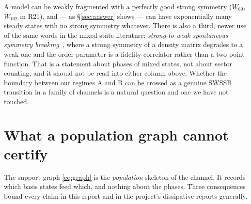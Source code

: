 \documentclass[11pt]{article}
\theoremstyle{plain}
\theoremstyle{definition}
\theoremstyle{remark}
\begin{document}
A model can be weakly fragmented with a perfectly good strong symmetry
($W_{60}$, $W_{102}$ in R21), and --- as \S\ref{sec:answer} shows --- can have
exponentially many steady states with no strong symmetry whatever. There is
also a third, newer use of the same words in the mixed-state literature:
\emph{strong-to-weak spontaneous symmetry breaking}~\cite{swssb2024}, where a
strong symmetry of a density matrix degrades to a weak one and the order
parameter is a fidelity correlator rather than a two-point function. That is a
statement about phases of mixed states, not about sector counting, and it
should not be read into either column above. Whether the boundary between our
regimes A and B can be crossed as a genuine SWSSB transition in a family of
channels is a natural question and one we have not touched.

\section{What a population graph cannot certify}
\label{sec:cannot}

The support graph \eqref{eq:graph} is the \emph{population} skeleton of the
channel. It records which basis states feed which, and nothing about the
phases. Three consequences bound every claim in this report and in the
project's dissipative reports generally.
\end{document}
